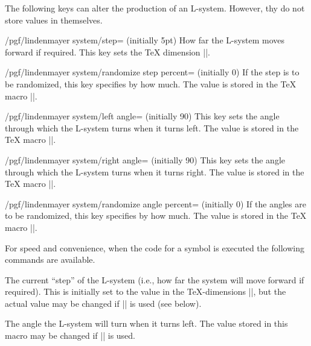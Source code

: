 \begin{command}{\pgfdeclarelindenmayersystem{}}
\begin{command}{\symbol{}}
The following keys can alter the production of an L-system. However,
thy do not store values in themselves.

\begin{key}{/pgf/lindenmayer system/step= (initially 5pt)}
  How far the L-system moves forward if required. This key sets the
  \TeX{} dimension |\pgflsystemstep|.
\end{key}

\begin{key}{/pgf/lindenmayer system/randomize step percent= (initially 0)}
  If the step is to be randomized, this key specifies by how much.
  The value is stored in the \TeX{} macro |\pgflsystemrandomizesteppercent|.
\end{key}

\begin{key}{/pgf/lindenmayer system/left angle= (initially 90)}
  This key sets the angle through which the L-system turns when it
  turns left.
  The value is stored in the \TeX{} macro |\pgflsystemrleftangle|.
\end{key}

\begin{key}{/pgf/lindenmayer system/right angle= (initially 90)}
  This key sets the angle through which the L-system turns when it
  turns right.
  The value is stored in the \TeX{} macro |\pgflsystemrrightangle|.
\end{key}

\begin{key}{/pgf/lindenmayer system/randomize angle percent= (initially 0)}
  If the angles are to be randomized, this key specifies by how much.
  The value is stored in the \TeX{} macro |\pgflsystemrandomizeanglepercent|.
\end{key}

For speed and convenience, when the code for a symbol is executed the
following commands are available.

\begin{command}{\pgflsystemcurrentstep}
	The current ``step'' of the L-system (i.e., how far the system
	will move forward if required). This is initially set to the
	value in the \TeX-dimensions |\pgflsystemstep|, but the actual
	value may be changed if |\pgflsystemrandomizestep| is used
	(see below).
\end{command}

\begin{command}{\pgflsystemcurrentleftangle}
	The angle the L-system will turn when it turns left.
	The value stored in this macro may be changed if
	|\pgflsystemrandomizeleftangle| is used.
\end{command}


\end{command}
\end{command}

